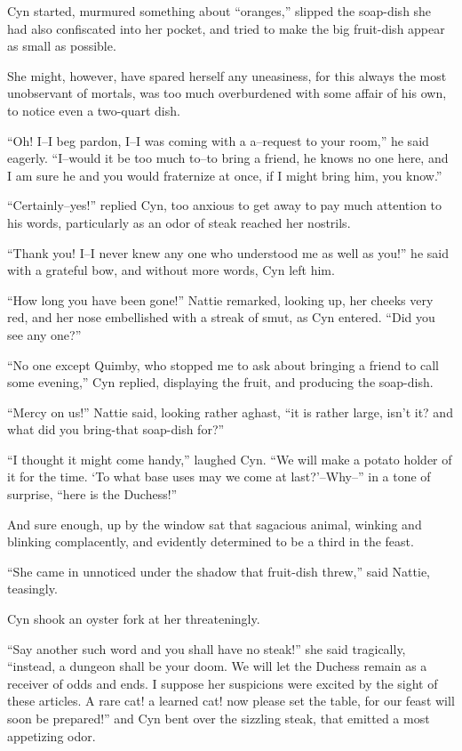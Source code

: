 Cyn started, murmured something about ``oranges,'' slipped the soap-dish
she had also confiscated into her pocket, and tried to make the big
fruit-dish appear as small as possible.

She might, however, have spared herself any uneasiness, for this always
the most unobservant of mortals, was too much overburdened with some
affair of his own, to notice even a two-quart dish.

``Oh! I--I beg pardon, I--I was coming with a a--request to your room,''
he said eagerly. ``I--would it be too much to--to bring a friend, he
knows no one here, and I am sure he and you would fraternize at once, if
I might bring him, you know.''

``Certainly--yes!'' replied Cyn, too anxious to get away to pay much
attention to his words, particularly as an odor of steak reached her
nostrils.

``Thank you! I--I never knew any one who understood me as well as you!''
he said with a grateful bow, and without more words, Cyn left him.

``How long you have been gone!'' Nattie remarked, looking up, her cheeks
very red, and her nose embellished with a streak of smut, as Cyn
entered. ``Did you see any one?''

``No one except Quimby, who stopped me to ask about bringing a friend to
call some evening,'' Cyn replied, displaying the fruit, and producing the
soap-dish.

``Mercy on us!'' Nattie said, looking rather aghast, ``it is rather large,
isn't it? and what did you bring-that soap-dish for?''

``I thought it might come handy,'' laughed Cyn. ``We will make a potato
holder of it for the time. `To what base uses may we come at
last?'--Why--'' in a tone of surprise, ``here is the Duchess!''

And sure enough, up by the window sat that sagacious animal, winking and
blinking complacently, and evidently determined to be a third in the
feast.

``She came in unnoticed under the shadow that fruit-dish threw,'' said
Nattie, teasingly.

Cyn shook an oyster fork at her threateningly.

``Say another such word and you shall have no steak!'' she said
tragically, ``instead, a dungeon shall be your doom. We will let the
Duchess remain as a receiver of odds and ends. I suppose her suspicions
were excited by the sight of these articles. A rare cat! a learned cat!
now please set the table, for our feast will soon be prepared!'' and Cyn
bent over the sizzling steak, that emitted a most appetizing odor.

